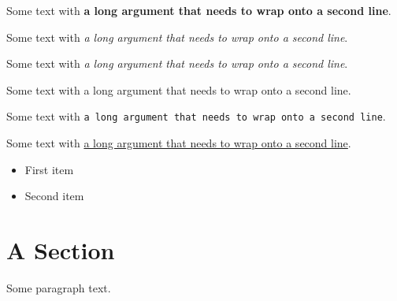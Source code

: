 \documentclass{article}
\begin{document}
Some text with \textbf{a long argument that
needs to wrap onto a second line}.

Some text with \emph{a long argument that
needs to wrap onto a second line}.

Some text with \textit{a long argument that
needs to wrap onto a second line}.

Some text with \textsf{a long argument that
needs to wrap onto a second line}.

Some text with \texttt{a long argument that
needs to wrap onto a second line}.

Some text with \underline{a long argument that
needs to wrap onto a second line}.

\begin{itemize}
  \item First item
  \item Second item
\end{itemize}

\section{A Section}

Some paragraph text.
\end{document}
